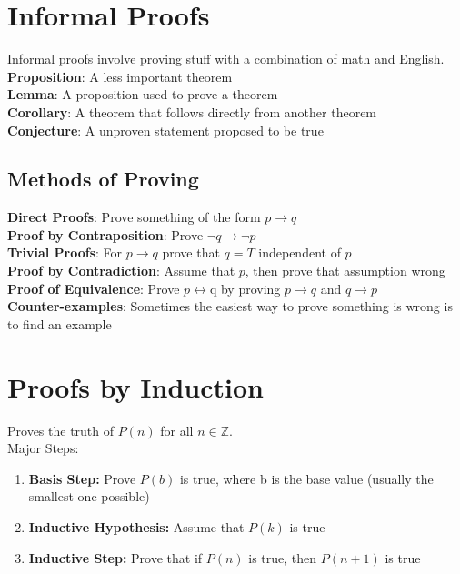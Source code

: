 \documentclass[letter]{article}
\begin{document}
\begin{multicols}{2}

  \section{Informal Proofs}
  Informal proofs involve proving stuff with a combination of math and English.
  \\
  \textbf{Proposition}: A less important theorem \\
  \textbf{Lemma}: A proposition used to prove a theorem \\
  \textbf{Corollary}: A theorem that follows directly from another theorem \\
  \textbf{Conjecture}: A unproven statement proposed to be true \\

  \subsection{Methods of Proving}
  \textbf{Direct Proofs}: Prove something of the form $p \rightarrow q$ \\
  \textbf{Proof by Contraposition}: Prove $\neg q \rightarrow \neg p$ \\
  \textbf{Trivial Proofs}: For $p \rightarrow q$ prove that $q = T$ independent
  of $p$ \\
  \textbf{Proof by Contradiction}: Assume that $p$, then prove that assumption
  wrong \\
  \textbf{Proof of Equivalence}: Prove $p \leftrightarrow $q by proving
  $p \rightarrow q$ and $q \rightarrow p$ \\
  \textbf{Counter-examples}: Sometimes the easiest way to prove something is
  wrong is to find an example\\

  \section{Proofs by Induction}
  Proves the truth of $P(n)$ for all $n \in \mathbb{Z}$.\\
  Major Steps:
  \begin{enumerate}
    \item \textbf{Basis Step:} Prove $P(b)$ is true, where b is the base value
          (usually the smallest one possible)
    \item \textbf{Inductive Hypothesis:} Assume that $P(k)$ is true
    \item \textbf{Inductive Step:} Prove that if $P(n)$ is true, then $P(n + 1)$
          is true
  \end{enumerate}


\end{multicols}
\end{document}
